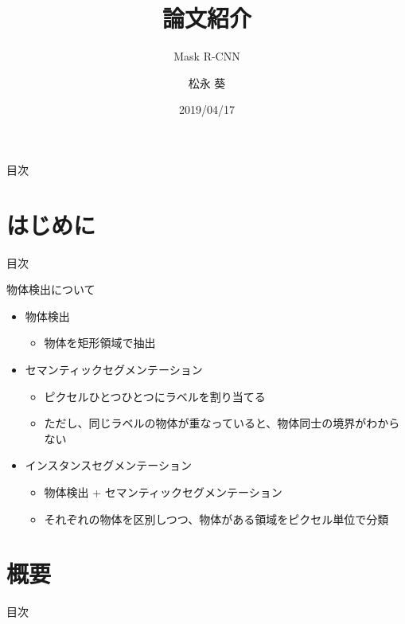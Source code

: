 \documentclass[aspectratio=169, dvipdfmx, 11pt]{beamer}
\title{論文紹介}
\subtitle{Mask R-CNN}
\author{松永 葵}
\institute{谷口研究室 B4}
\date{2019/04/17}
\begin{document}
\maketitle

\begin{frame}{目次}
    \tableofcontents
\end{frame}

\section{はじめに}
\begin{frame}{目次}
    \tableofcontents[currentsection]
\end{frame}

\begin{frame}{物体検出について}
	\begin{itemize}
    	\item 物体検出
        \begin{itemize}
        	\item 物体を矩形領域で抽出 \\
        \end{itemize}
        \item セマンティックセグメンテーション \\
        \begin{itemize}
        	\item ピクセルひとつひとつにラベルを割り当てる \\
            \item ただし、同じラベルの物体が重なっていると、物体同士の境界がわからない \\
        \end{itemize}
        \item インスタンスセグメンテーション \\
        \begin{itemize}
        	\item 物体検出 + セマンティックセグメンテーション \\
			\item それぞれの物体を区別しつつ、物体がある領域をピクセル単位で分類
        \end{itemize}
    \end{itemize}
\end{frame}


\section{概要}
\begin{frame}{目次}
    \tableofcontents[currentsection]
\end{frame}
\end{document}
